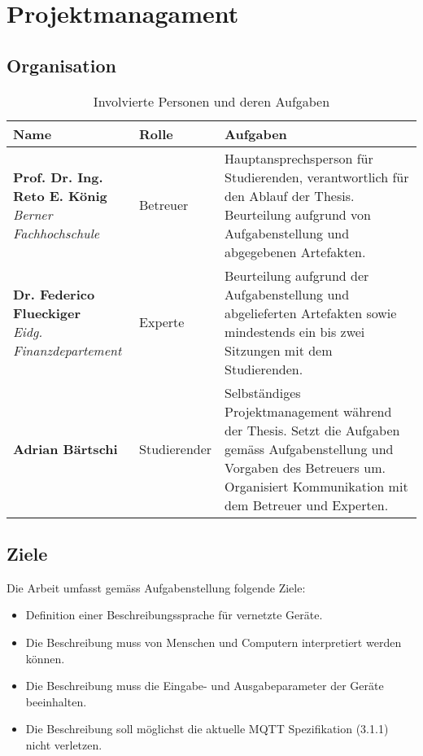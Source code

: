 \chapter{Projektmanagament}
\label{chap:projectmanagement}

\section{Organisation}

\begin{table}[H]
\begin{tabularx}{\textwidth}{|l|l|X|}

 \hline \rowcolor{lightgray}
 {\bf Name } & {\bf Rolle } & {\bf Aufgaben} \\  \hline
  \parbox[t]{5cm}{\textbf{Prof. Dr. Ing. Reto E. König} \\ \textit{Berner Fachhochschule}}  &   Betreuer  &
  Hauptansprechsperson für Studierenden, verantwortlich für den Ablauf der Thesis. Beurteilung aufgrund von Aufgabenstellung und abgegebenen Artefakten.   \\
 \hline
  \parbox[t]{5cm}{\textbf{Dr. Federico Flueckiger} \\ \textit{Eidg.  Finanzdepartement}} &   Experte     &
  Beurteilung aufgrund der Aufgabenstellung und abgelieferten Artefakten sowie mindestends ein bis zwei Sitzungen mit dem Studierenden. \\ 
\hline
 \textbf{Adrian Bärtschi}                &   Studierender   &     
 Selbständiges Projektmanagement während der Thesis. Setzt die Aufgaben gemäss Aufgabenstellung und Vorgaben des Betreuers um. Organisiert Kommunikation mit dem Betreuer und Experten.   \\
 \hline


\end{tabularx}
\caption{Involvierte Personen und deren Aufgaben}
\end{table}


\section{Ziele}
Die Arbeit umfasst gemäss Aufgabenstellung folgende Ziele:
\begin{itemize}
    \item Definition einer Beschreibungssprache für vernetzte Geräte.
    \item Die Beschreibung muss von Menschen und Computern interpretiert werden können.
    \item Die Beschreibung muss die Eingabe- und Ausgabeparameter der Geräte beeinhalten.
    \item Die Beschreibung soll möglichst die aktuelle MQTT Spezifikation (3.1.1) nicht verletzen.
\end{itemize}

